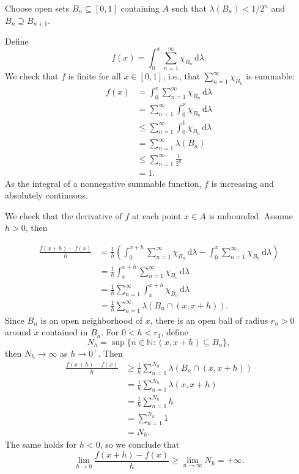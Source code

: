 \documentclass[12pt]{article}
\theoremstyle{definition}
\newcommand{\N}{\mathbb{N}}
\newcommand{\<}{\langle}
\renewcommand{\>}{\rangle}
\newcommand{\seq}{\subseteq}
\newcommand{\dd}{\,\mathrm{d}}
\begin{document}
Choose open sets $B_n \seq [0, 1]$ containing $A$ such that $\lambda(B_n) < 1/2^n$ and $B_n \supseteq B_{n+1}$.

Define
\[
    f(x) = \int_{0}^{x} \sum_{n=1}^{\infty} \chi_{B_n} \dd{\lambda}.
\]
We check that $f$ is finite for all $x \in [0, 1]$, i.e., that $\sum_{n=1}^{\infty} \chi_{B_n}$ is summable:
\begin{align*}
    f(x)
        &= \int_{0}^{x} \sum_{n=1}^{\infty} \chi_{B_n} \dd{\lambda} \\
        &= \sum_{n=1}^{\infty} \int_{0}^{x} \chi_{B_n} \dd{\lambda} \\
        &\leq \sum_{n=1}^{\infty} \int_{0}^{1} \chi_{B_n} \dd{\lambda} \\
        &= \sum_{n=1}^{\infty} \lambda(B_n) \\
        &\leq \sum_{n=1}^{\infty} \frac{1}{2^n} \\
        &= 1.
\end{align*}
As the integral of a nonnegative summable function, $f$ is increasing and absolutely continuous.

We check that the derivative of $f$ at each point $x \in A$ is unbounded.
Assume $h > 0$, then

\begin{align*}
    \frac{f(x + h) - f(x)}{h}
        &= \frac{1}{h} \left(\int_{0}^{x+h} \sum_{n=1}^{\infty} \chi_{B_n} \dd{\lambda} - \int_{0}^{x} \sum_{n=1}^{\infty} \chi_{B_n} \dd{\lambda}\right) \\
        &= \frac{1}{h} \int_{x}^{x+h} \sum_{n=1}^{\infty} \chi_{B_n} \dd{\lambda} \\
        &= \frac{1}{h} \sum_{n=1}^{\infty} \int_{x}^{x+h} \chi_{B_n} \dd{\lambda} \\
        &= \frac{1}{h} \sum_{n=1}^{\infty} \lambda(B_n \cap (x, x+ h)).
\end{align*}
Since $B_n$ is an open neighborhood of $x$, there is an open ball of radius $r_n > 0$ around $x$ contained in $B_n$.
For $0 < h < r_1$, define
\[
    N_h = \sup\{n \in \N : (x, x + h) \seq B_n\},
\]
then $N_h \to \infty$ as $h \to 0^+$.
Then
\begin{align*}
    \frac{f(x + h) - f(x)}{h}
        &\geq \frac{1}{h} \sum_{n=1}^{N_h} \lambda(B_n \cap (x, x + h)) \\
        &= \frac{1}{h} \sum_{n=1}^{N_h} \lambda(x, x + h) \\
        &= \frac{1}{h} \sum_{n=1}^{N_h} h \\
        &= \sum_{n=1}^{N_h} 1\\
        &= N_h.
\end{align*}
The same holds for $h < 0$, so we conclude that
\[
    \lim_{h \to 0} \frac{f(x + h) - f(x)}{h} \geq \lim_{n \to \infty} N_h = + \infty.
\]
\end{document}
